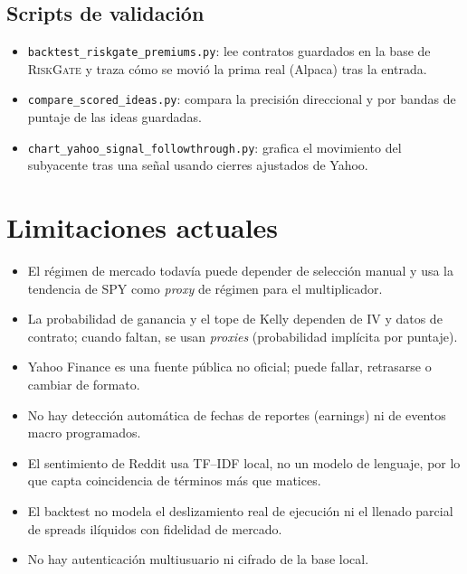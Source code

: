 \documentclass[11pt,letterpaper]{article}
\newcommand{\RiskGate}{\textsc{RiskGate}}
\begin{document}
\subsection{Scripts de validación}
\begin{itemize}[noitemsep]
  \item \texttt{backtest\_riskgate\_premiums.py}: lee contratos guardados en la
        base de \RiskGate{} y traza cómo se movió la prima real (Alpaca) tras la
        entrada.
  \item \texttt{compare\_scored\_ideas.py}: compara la precisión direccional y por
        bandas de puntaje de las ideas guardadas.
  \item \texttt{chart\_yahoo\_signal\_followthrough.py}: grafica el movimiento del
        subyacente tras una señal usando cierres ajustados de Yahoo.
\end{itemize}

\section{Limitaciones actuales}

\begin{itemize}[noitemsep]
  \item El régimen de mercado todavía puede depender de selección manual y usa la
        tendencia de SPY como \emph{proxy} de régimen para el multiplicador.
  \item La probabilidad de ganancia y el tope de Kelly dependen de IV y datos de
        contrato; cuando faltan, se usan \emph{proxies} (probabilidad implícita
        por puntaje).
  \item Yahoo Finance es una fuente pública no oficial; puede fallar, retrasarse o
        cambiar de formato.
  \item No hay detección automática de fechas de reportes (earnings) ni de eventos
        macro programados.
  \item El sentimiento de Reddit usa TF--IDF local, no un modelo de lenguaje, por
        lo que capta coincidencia de términos más que matices.
  \item El backtest no modela el deslizamiento real de ejecución ni el llenado
        parcial de spreads ilíquidos con fidelidad de mercado.
  \item No hay autenticación multiusuario ni cifrado de la base local.
\end{itemize}
\end{document}
